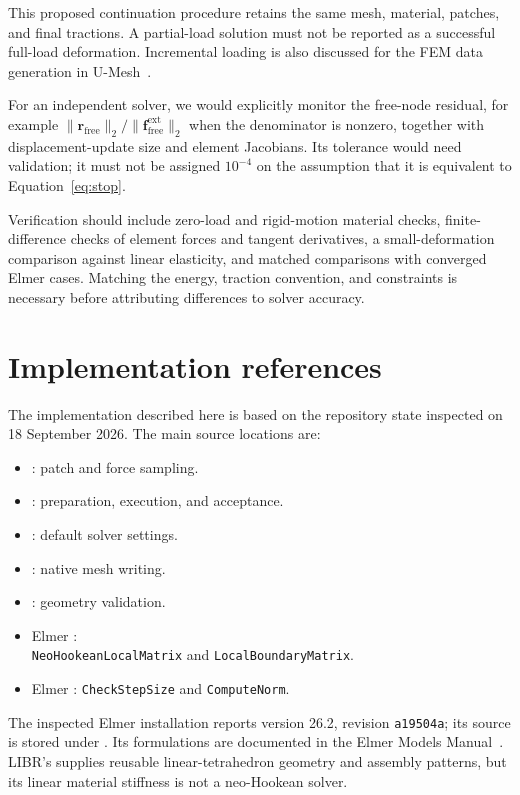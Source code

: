 \documentclass[11pt]{article}
\newcommand{\vect}[1]{\boldsymbol{#1}}
\begin{document}
This proposed continuation procedure retains the same mesh, material, patches,
and final tractions. A partial-load solution must not be reported as a successful
full-load deformation. Incremental loading is also discussed for the FEM data
generation in U-Mesh~\cite{mendizabal}.

For an independent solver, we would explicitly monitor the free-node residual,
for example $\|\vect{r}_{\mathrm{free}}\|_2/
\|\vect{f}^{\mathrm{ext}}_{\mathrm{free}}\|_2$ when the denominator is nonzero,
together with displacement-update size and element Jacobians. Its tolerance
would need validation; it must not be assigned $10^{-4}$ on the assumption that
it is equivalent to Equation~\eqref{eq:stop}.

Verification should include zero-load and rigid-motion material checks,
finite-difference checks of element forces and tangent derivatives, a
small-deformation comparison against linear elasticity, and matched comparisons
with converged Elmer cases. Matching the energy, traction convention, and
constraints is necessary before attributing differences to solver accuracy.

\section*{Implementation references}
The implementation described here is based on the repository state inspected on
18 September 2026. The main source locations are:
\begin{itemize}
  \item {}: patch and force sampling.
  \item {}: preparation, execution, and acceptance.
  \item {}: default solver settings.
  \item {}: native mesh writing.
  \item {}: geometry validation.
  \item Elmer :\\
    \texttt{NeoHookeanLocalMatrix} and \texttt{LocalBoundaryMatrix}.
  \item Elmer :
    \texttt{CheckStepSize} and \texttt{ComputeNorm}.
\end{itemize}
The inspected Elmer installation reports version 26.2, revision
\texttt{a19504a}; its source is stored under
. Its formulations are documented
in the Elmer Models Manual~\cite{elmer}. LIBR's
 supplies reusable linear-tetrahedron geometry
and assembly patterns, but its linear material stiffness is not a neo-Hookean solver.
\end{document}
